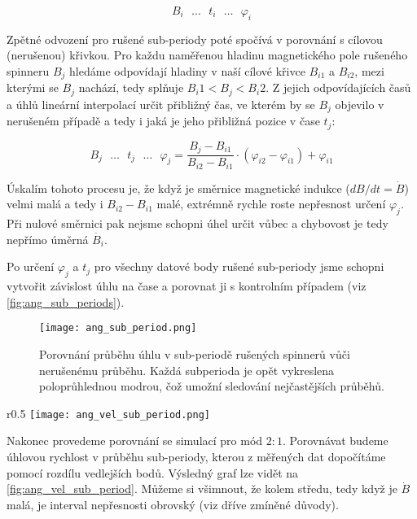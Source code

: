 $$
    B_i \text{ } \ldots \text{ } t_i \text{ } \ldots \text{ } \varphi_i
$$

Zpětné odvození pro rušené sub-periody poté spočívá v porovnání s cílovou (nerušenou) křivkou. Pro každu naměřenou hladinu magnetického pole rušeného spinneru $B_j$ hledáme odpovídají hladiny v naší cílové křivce $B_{i1}$ a $B_{i2}$, mezi kterými se $B_j$ nachází, tedy splňuje $B_i1 < B_j < B_i2$. Z jejich odpovídajících časů a úhlů lineární interpolací určit přibližný čas, ve kterém by se $B_j$ objevilo v nerušeném případě a tedy i jaká je jeho přibližná pozice v čase $t_j$:

$$
    B_j \text{ } \ldots \text{ } t_j \text{ } \ldots \text{ } \varphi_j = \frac{B_j - B_{i1}}{B_{i2} - B_{i1}} \cdot (\varphi_{i2} - \varphi_{i1}) + \varphi_{i1}
$$

Úskalím tohoto procesu je, že když je směrnice magnetické indukce ($dB/dt = \dot{B}$) velmi malá a tedy i $B_{i2} - B_{i1}$ malé, extrémně rychle roste nepřesnost určení $\varphi_j$. Při nulové směrnici pak nejsme schopni úhel určit vůbec a chybovost je tedy nepřímo úměrná $\dot{B_i}$.

Po určení $\varphi_j$ a $t_j$ pro všechny datové body rušené sub-periody jsme schopni vytvořit závislost úhlu na čase a porovnat ji s kontrolním případem (viz \autoref{fig:ang_sub_periods}). 

\clearpage

\begin{figure}[H]
    \texttt{[image: ang\_sub\_period.png]}
    \centering
    \caption[Porovnání průběhu úhlu v sub-periodě rušených spinnerů vůči nerušenému průběhu]{Porovnání průběhu úhlu v sub-periodě rušených spinnerů vůči nerušenému průběhu. Každá subperioda je opět vykreslena poloprůhlednou modrou, čož umožní sledování nejčastějších průběhů.}
    \label{fig:ang_sub_periods}
\end{figure}

\begin{wrapfigure}{r}{0.5\textwidth}
    \texttt{[image: ang\_vel\_sub\_period.png]}
    \centering
    \caption{Porovnání měřeného a simulovaného průběhu úhlové rychlosti v čase pro mód $2:1$}
    \label{fig:ang_vel_sub_period}
\end{wrapfigure}

Nakonec provedeme porovnání se simulací pro mód $2:1$. Porovnávat budeme úhlovou rychlost v průběhu sub-periody, kterou z měřených dat dopočítáme pomocí rozdílu vedlejších bodů. Výsledný graf lze vidět na \ref{fig:ang_vel_sub_period}. Můžeme si všimnout, že kolem středu, tedy když je $\dot{B}$ malá, je interval nepřesnosti obrovský (viz dříve zmíněné důvody).

